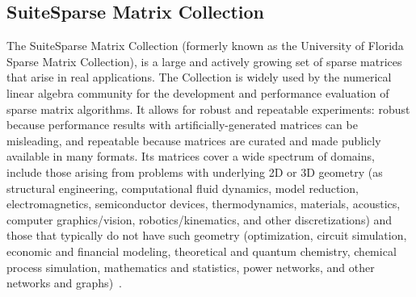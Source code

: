 \subsection{SuiteSparse Matrix Collection}
The SuiteSparse Matrix Collection (formerly known as the University of Florida 
Sparse Matrix Collection), is a large and actively growing set of sparse 
matrices that arise in real applications. The Collection is widely used by the 
numerical linear algebra community for the development and performance 
evaluation of sparse matrix algorithms. It allows for robust and repeatable 
experiments: robust because performance results with artificially-generated 
matrices can be misleading, and repeatable because matrices are curated and made 
publicly available in many formats. Its matrices cover a wide spectrum of 
domains, include those arising from problems with underlying 2D or 3D geometry 
(as structural engineering, computational fluid dynamics, model reduction, 
electromagnetics, semiconductor devices, thermodynamics, materials, acoustics, 
computer graphics/vision, robotics/kinematics, and other discretizations) and 
those that typically do not have such geometry (optimization, circuit 
simulation, economic and financial modeling, theoretical and quantum chemistry, 
chemical process simulation, mathematics and statistics, power networks, and 
other networks and graphs)~\cite{florida}. 

